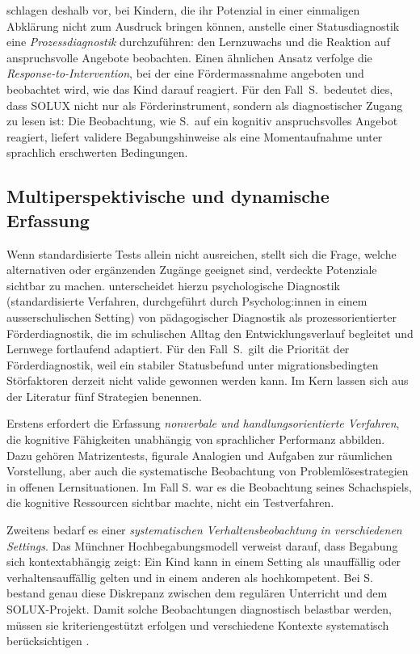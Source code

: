 \documentclass[ngerman, a4paper]{article}
\begin{document}
\textcite[S.\,239--249]{gauckreimann2021psychdiagnostik} schlagen deshalb
vor, bei Kindern, die ihr Potenzial in einer einmaligen Abklärung nicht zum
Ausdruck bringen können, anstelle einer Statusdiagnostik eine
\textit{Prozessdiagnostik} durchzuführen: den Lernzuwachs und die Reaktion
auf anspruchsvolle Angebote beobachten. Einen ähnlichen Ansatz verfolge die
\textit{Response-to-Intervention}, bei der eine Fördermassnahme angeboten
und beobachtet wird, wie das Kind darauf reagiert. Für den Fall~S.\ bedeutet
dies, dass SOLUX nicht nur als Förderinstrument, sondern als diagnostischer
Zugang zu lesen ist: Die Beobachtung, wie S.\ auf ein kognitiv
anspruchsvolles Angebot reagiert, liefert validere Begabungshinweise als
eine Momentaufnahme unter sprachlich erschwerten Bedingungen.

\subsection{Multiperspektivische und dynamische Erfassung}

Wenn standardisierte Tests allein nicht ausreichen, stellt sich die Frage, welche
alternativen oder ergänzenden Zugänge geeignet sind, verdeckte Potenziale sichtbar
zu machen. \textcite[S.\,224--235]{muelleroppliger2021paeddiagnostik} unterscheidet
hierzu psychologische Diagnostik (standardisierte Verfahren, durchgeführt durch
Psycholog:innen in einem ausserschulischen Setting) von pädagogischer Diagnostik
als prozessorientierter Förderdiagnostik, die im schulischen Alltag den
Entwicklungsverlauf begleitet und Lernwege fortlaufend adaptiert. Für den Fall~S.\
gilt die Priorität der Förderdiagnostik, weil ein stabiler Statusbefund unter
migrationsbedingten Störfaktoren derzeit nicht valide gewonnen werden kann.
Im Kern lassen sich aus der Literatur fünf Strategien benennen.

Erstens erfordert die Erfassung \textit{nonverbale und handlungsorientierte Verfahren}, die
kognitive Fähigkeiten unabhängig von sprachlicher Performanz abbilden. Dazu gehören
Matrizentests, figurale Analogien und Aufgaben zur räumlichen Vorstellung, aber auch
die systematische Beobachtung von Problemlösestrategien in offenen Lernsituationen.
Im Fall S. war es die Beobachtung seines Schachspiels, die kognitive Ressourcen sichtbar
machte, nicht ein Testverfahren.

Zweitens bedarf es einer \textit{systematischen Verhaltensbeobachtung in verschiedenen
  Settings}. Das Münchner Hochbegabungsmodell verweist darauf, dass Begabung sich
kontextabhängig zeigt: Ein Kind kann in einem Setting als unauffällig oder
verhaltensauffällig gelten und in einem anderen als hochkompetent. Bei S. bestand genau
diese Diskrepanz zwischen dem regulären Unterricht und dem SOLUX-Projekt.
Damit solche Beobachtungen diagnostisch belastbar werden, müssen sie
kriteriengestützt erfolgen und verschiedene Kontexte systematisch
berücksichtigen \parencite[S.\,224--235]{muelleroppliger2021paeddiagnostik}.
\end{document}
